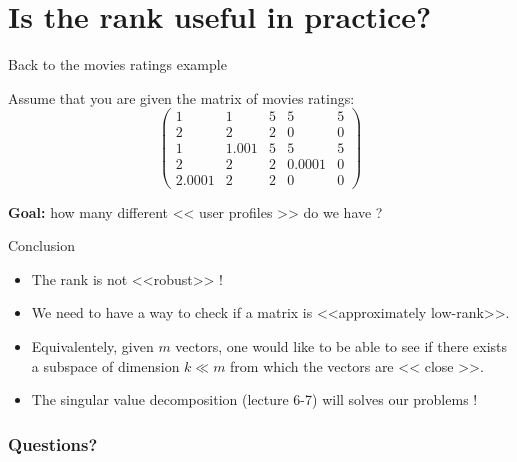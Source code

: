 \documentclass{beamer}
\begin{document}
\section{Is the rank useful in practice?}

\begin{frame}[t]{Back to the movies ratings example}
	\grid

	\vspace{-0.3cm}
	Assume that you are given the matrix of movies ratings:
	$$
	\begin{pmatrix}
		1 & 1 & 5 & 5 & 5 \\
		2 & 2 & 2 & 0 & 0 \\
		1 & 1.001 & 5 & 5 & 5 \\
		2 & 2 & 2 & 0.0001 & 0 \\
		2.0001 & 2 & 2 & 0 & 0 
	\end{pmatrix}
	$$

	\vspace{0.5cm}
	\textbf{Goal:} how many different << user profiles >> do we have ?
\end{frame}



\begin{frame}[t]{Conclusion}
	\grid

			\vspace{0.5cm}
	\begin{itemize}
		\item The rank is not <<robust>> !
			\vspace{0.5cm}
		\item We need to have a way to check if a matrix is <<approximately low-rank>>.
			\vspace{0.5cm}
		\item Equivalentely, given $m$ vectors, one would like to be able to see if there exists a subspace of dimension $k \ll m$ from which the vectors are << close >>.
			\vspace{0.5cm}
		\item The singular value decomposition (lecture 6-7) will solves our problems !
	\end{itemize}
\end{frame}


\appendix
\backupbegin
\begin{frame}[t]
	\frametitle{Questions?}
	\grid

	\pause
	\pause
\end{frame}
\backupend
\end{document}
